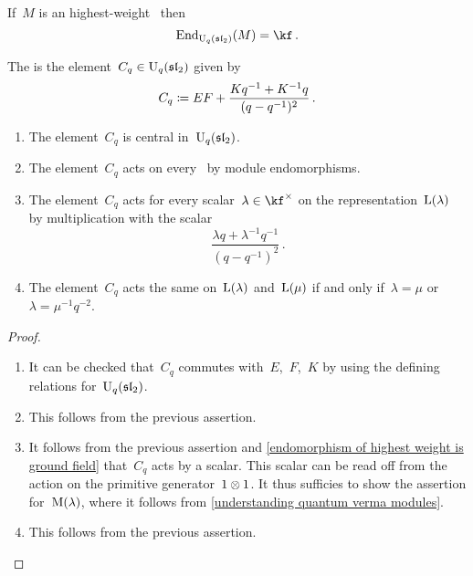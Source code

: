 \documentclass[a4paper, 11pt, oneside]{scrartcl}
\begin{document}
\begin{lemma}
  \label{endomorphism of highest weight is ground field}
  If~$M$ is an highest-weight~ then
  \[
    \End_{\Univ_q(\sllie_2)}(M) = \kf \,.
  \]
\end{lemma}

\begin{definition}
  The  is the element~$C_q \in \operatorname{U}_q(\mathfrak{sl}_2)$ given by
  \[
    C_q
    \coloneqq
    EF + \frac{ K q^{-1} + K^{-1} q }{ (q - q^{-1})^2 } \,.
  \]
\end{definition}

\begin{lemma}
  \label{action of the quantum casimir element}
  \leavevmode
  \begin{enumerate}
    \item
      The element~$C_q$ is central in~$\operatorname{U}_q(\mathfrak{sl}_2)$.
    \item
      The element~$C_q$ acts on every~ by module endomorphisms.
    \item
      The element~$C_q$ acts for every scalar~$\lambda \in \kf^\times$ on the representation~$\operatorname{L}(\lambda)$ by multiplication with the scalar
      \[
        \frac{\lambda q + \lambda^{-1} q^{-1}}{ (q - q^{-1})^2 } \,.
      \]
    \item
      The element~$C_q$ acts the same on~$\operatorname{L}(\lambda)$ and~$\operatorname{L}(\mu)$ if and only if~$\lambda = \mu$ or~$\lambda = \mu^{-1} q^{-2}$.
  \end{enumerate}
\end{lemma}

\begin{proof}
  \leavevmode
  \begin{enumerate}
    \item
      It can be checked that~$C_q$ commutes with~$E$,~$F$,~$K$ by using the defining relations for~$\operatorname{U}_q(\mathfrak{sl}_2)$.
    \item
      This follows from the previous assertion.
    \item
 
     It follows from the previous assertion and \cref{endomorphism of highest weight is ground field} that~$C_q$ acts by a scalar.
      This scalar can be read off from the action on the primitive generator~$1 \otimes 1$.
      It thus sufficies to show the assertion for~$\operatorname{M}(\lambda)$, where it follows from \cref{understanding quantum verma modules}.
    \item
      This follows from the previous assertion.
    \qedhere
  \end{enumerate}
\end{proof}
\end{document}
